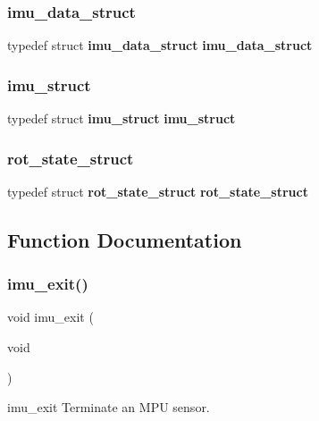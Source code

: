 \mbox{\label{imu_8h_a7c1e9f7a62bb08216ed2d86e89826188}} 
\subsubsection{imu\+\_\+data\+\_\+struct}
{\footnotesize\ttfamily typedef struct \textbf{ imu\+\_\+data\+\_\+struct}  \textbf{ imu\+\_\+data\+\_\+struct}}

\mbox{\label{imu_8h_a328d52ee50132afd0a7fb662069b5c26}} 
\subsubsection{imu\+\_\+struct}
{\footnotesize\ttfamily typedef struct \textbf{ imu\+\_\+struct}  \textbf{ imu\+\_\+struct}}

\mbox{\label{imu_8h_aa2ff45ec0c4488115dea08036c2f3fd7}} 
\subsubsection{rot\+\_\+state\+\_\+struct}
{\footnotesize\ttfamily typedef struct \textbf{ rot\+\_\+state\+\_\+struct}  \textbf{ rot\+\_\+state\+\_\+struct}}



\subsection{Function Documentation}
\mbox{\label{imu_8h_adc3ee21523634d4aa99807b453f3afbd}} 
\subsubsection{imu\+\_\+exit()}
{\footnotesize\ttfamily void imu\+\_\+exit (\begin{DoxyParamCaption}\item[{void}]{ }\end{DoxyParamCaption})}

imu\+\_\+exit Terminate an M\+PU sensor. \mbox{\label{imu_8h_a86a06fe7a9831292bd92867da2d12f80}} 
